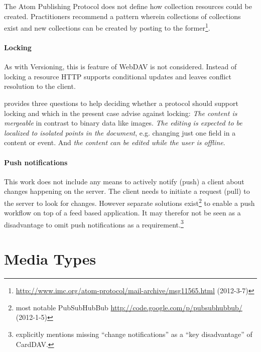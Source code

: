 \documentclass[12pt,a4paper]{scrartcl}		%
\newcommand{\citeurl}[2]{\url{#1} (#2)}
\begin{document}
The Atom Publishing Protocol does not define how collection resources could be
created. Practitioners recommend a pattern wherein collections of collections
exist and new collections can be created by posting to the
former\footnote{\citeurl{http://www.imc.org/atom-protocol/mail-archive/msg11565.html}{2012-3-7}}.

\paragraph{Locking}
As with Versioning, this is feature of WebDAV is not considered. Instead of
locking a resource HTTP supports conditional updates and leaves conflict
resolution to the client.

\cite[sec. 1]{Nielsen1999} provides three questions to help deciding whether a
protocol should support locking and which in the present case advise against
locking: \textit{The content is mergeable} in contrast to binary data like
images. \textit{The editing is expected to be localized to isolated points in
  the document}, e.g. changing just one field in a content or event. And
\textit{the content can be edited while the user is offline}.

\paragraph{Push notifications}
This work does not include any means to actively notify (push) a client about
changes happening on the server. The client needs to initiate a request (pull)
to the server to look for changes. However separate solutions
exist\footnote{most notable PubSubHubBub
  \citeurl{http://code.google.com/p/pubsubhubbub/}{2012-1-5}} to enable a push
workflow on top of a feed based
application\cite{Wilde:2009:FQP:1693155.1693220}. It may therefor not be seen as
a disadvantage to omit push notifications as a
requirement.\footnote{\cite[sec. 1]{RFC6352} explicitly mentions missing
  ``change notifications'' as a ``key disadvantage'' of CardDAV.}


\section{Media Types}

\end{document}
